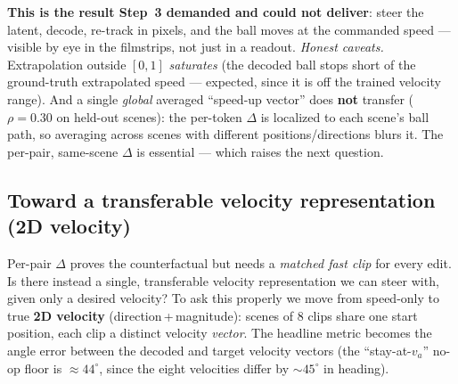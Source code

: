 \documentclass{article} %
\begin{document}
  \textbf{This is the result Step~3 demanded and could not deliver}: steer the latent, decode, re-track
  in pixels, and the ball moves at the commanded speed --- visible by eye in the filmstrips, not just in
  a readout. \emph{Honest caveats.} Extrapolation outside $[0,1]$ \emph{saturates} (the decoded ball
  stops short of the ground-truth extrapolated speed --- expected, since it is off the trained velocity
  range). And a single \emph{global} averaged ``speed-up vector'' does \textbf{not} transfer ($\rho=0.30$
  on held-out scenes): the per-token $\Delta$ is localized to each scene's ball path, so averaging across
  scenes with different positions/directions blurs it. The per-pair, same-scene $\Delta$ is essential ---
  which raises the next question.

  \subsection{Toward a transferable velocity representation (2D velocity)}
  Per-pair $\Delta$ proves the counterfactual but needs a \emph{matched fast clip} for every edit. Is
  there instead a single, transferable velocity representation we can steer with, given only a desired
  velocity? To ask this properly we move from speed-only to true \textbf{2D velocity}
  (direction\,+\,magnitude): scenes of 8 clips share one start position, each clip a distinct velocity
  \emph{vector}. The headline metric becomes the angle error between the decoded and target velocity
  vectors (the ``stay-at-$v_a$'' no-op floor is $\approx44^\circ$, since the eight velocities differ by
  $\sim45^\circ$ in heading).
\end{document}
